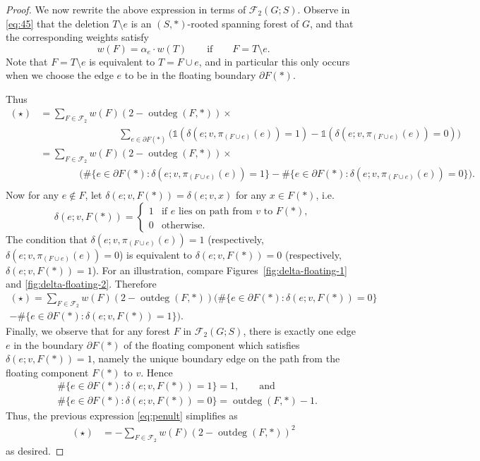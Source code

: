 \documentclass[12pt]{amsart}
\theoremstyle{definition}
\newcommand{\one}{\mathds{1}}
\newcommand{\forests}{\mathcal{F}}
\DeclareMathOperator{\outdeg}{outdeg}
\begin{document}
\begin{proof}
We now rewrite the above expression in terms of $\forests_2(G;S)$.
Observe in \eqref{eq:45} that the deletion $T \setminus e$ is an $(S,*)$-rooted spanning forest of $G$, and that the corresponding weights satisfy
\[
	w({F}) = \alpha_e \cdot w({T}) \qquad\text{if}\qquad F = T \setminus e.
\]
Note that $F = T \setminus e$ is equivalent to $T = F \cup e$, and in particular this only occurs when we choose the edge $e$ to be in the floating boundary $\partial F(*)$.

Thus
\begin{align*}
	(\star) 
	&= \sum_{F \in \forests_2} w({F}) (2 - \outdeg(F, *)) \times \\
	& \qquad \qquad \qquad \qquad   \sum_{e \in \partial F(*)} \Big( \one(\delta(e; v, \pi_{(F \cup e)}(e)) = 1) - \one(\delta(e; v, \pi_{(F \cup e)}(e)) = 0) \Big) \\
	&= \sum_{F \in \forests_2} w({F}) (2 - \outdeg(F,*)) \times \\
	& \qquad\qquad \Bigg( \#\{e \in \partial F(*) \colon \delta(e; v, \pi_{(F \cup e)}(e)) = 1\} - \#\{e \in \partial F(*) \colon \delta(e; v, \pi_{(F \cup e)}(e)) = 0\} \Bigg). \\
\end{align*}
Now for any $e \not\in F$, let $\delta(e; v, F(*)) = \delta(e; v, x)$ for any $x \in F(*)$, i.e.
\[
	\delta(e; v, F(*)) = \begin{cases}
	1 &\text{if $e$ lies on path from $v$ to $F(*)$}, \\
	0 &\text{otherwise}.
	\end{cases}
\]
The condition that $\delta(e; v, \pi_{(F \cup e)}(e)) = 1$ (respectively, $\delta(e; v, \pi_{(F \cup e)}(e)) = 0$)
is equivalent to ${\delta(e; v, F(*)) = 0}$ (respectively, ${\delta(e; v, F(*)) = 1}$).
For an illustration, compare Figures~\ref{fig:delta-floating-1} and \ref{fig:delta-floating-2}.
Therefore
\begin{multline}\label{eq:penult}
	(\star) = \sum_{F \in \forests_2} w({F}) (2 - \outdeg(F,*))  \Bigg( \#\{e \in \partial F(*) \colon \delta(e; v, F(*)) = 0 \}  \\
	- \#\{e \in \partial F(*) \colon \delta(e; v, F(*)) = 1 \}  \Bigg).
\end{multline}
Finally, we observe that for any forest $F$ in $\forests_2(G;S)$,
there is exactly one edge $e$ in the boundary $\partial F(*)$ of the floating component which satisfies $\delta(e; v, F(*)) = 1$, namely the unique boundary edge on the path from the floating component $F(*)$ to $v$.
Hence
\begin{align*}
	&\#\{e \in \partial F(*) \colon \delta(e;v, F(*)) = 1 \} = 1,
\qquad\text{and}\qquad \\
	&\#\{e \in \partial F(*) \colon \delta(e;v, F(*)) = 0 \} = \outdeg(F,*) - 1 .
\end{align*}
Thus, the previous expression \eqref{eq:penult} simplifies as
\begin{align*}
	(\star) 
	&= - \!\sum_{F \in \forests_2} w({F}) (2 - \outdeg(F,*))^2 
\end{align*}
as desired.
\end{proof}
\end{document}

